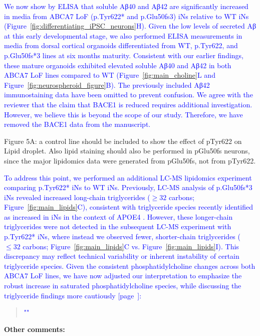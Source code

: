 \textcolor{blue}{We now show by ELISA that soluble Aβ40 and Aβ42 are significantly increased in media from ABCA7 LoF (p.Tyr622* and p.Glu50fs3) iNs relative to WT iNs (Figure~\ref{fig:differentiating_iPSC_neurons}H). Given the low levels of secreted Aβ at this early developmental stage, we also performed ELISA measurements in media from dorsal cortical organoids differentiated from WT, p.Tyr622, and p.Glu50fs*3 lines at six months maturity. Consistent with our earlier findings, these mature organoids exhibited elevated soluble Aβ40 and Aβ42 in both ABCA7 LoF lines compared to WT (Figure~\ref{fig:main_choline}L and Figure~\ref{fig:neurospheroid_figure}B). The previously included Aβ42 immunostaining data have been omitted to prevent confusion. We agree with the reviewer that the claim that BACE1 is reduced requires additional investigation. However, we believe this is beyond the scope of our study. Therefore, we have removed the BACE1 data from the manuscript.}

Figure 5A: a control line should be included to show the effect of pTyr622 on Lipid droplet. Also lipid staining should also be performed in pGlu50fs neurons, since the major lipidomics data were generated from pGlu50fs, not from pTyr622.

\textcolor{blue}{To address this point, we performed an additional LC-MS lipidomics experiment comparing p.Tyr622* iNs to WT iNs. Previously, LC-MS analysis of p.Glu50fs*3 iNs revealed increased long-chain triglycerides ($\geq32$ carbons; Figure~\ref{fig:main_lipids}C), consistent with triglyceride species recently identified as increased in iNs in the context of APOE4 \cite{Haney2024-bp}. However, these longer-chain triglycerides were not detected in the subsequent LC-MS experiment with p.Tyr622* iNs, where instead we observed fewer, shorter-chain triglycerides ($\leq32$ carbons; Figure~\ref{fig:main_lipids}C vs. Figure~\ref{fig:main_lipids}I). This discrepancy may reflect technical variability or inherent instability of certain triglyceride species. Given the consistent phosphatidylcholine changes across both ABCA7 LoF lines, we have now adjusted our interpretation to emphasize the robust increase in saturated phosphatidylcholine species, while discussing the triglyceride findings more cautiously [page~\pageref{quoteH-label}]:}

\begin{quote}
	\textcolor{blue}{"\quoteH"}
\end{quote}

\textbf{Other comments:}

